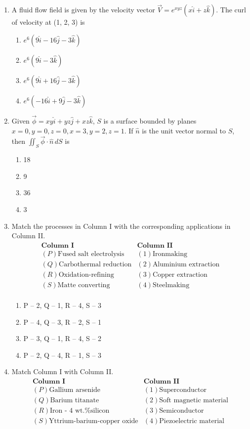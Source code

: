 \documentclass[12pt]{article}
\begin{document}
\begin{enumerate}
\item A fluid flow field is given by the velocity vector \(\vec{V} = e^{xyz}(x \hat{i} + z \hat{k})\). The curl of velocity at (1, 2, 3) is
\begin{enumerate}[label=(\alph*)]
\item \(e^{6}(9 \hat{i} - 16 \hat{j} - 3 \hat{k})\)
\item \(e^{6}(9 \hat{i} - 3 \hat{k})\)
\item \(e^{6}(9 \hat{i} + 16 \hat{j} - 3 \hat{k})\)
\item \(e^{6}(-16 \hat{i} + 9 \hat{j} - 3 \hat{k})\)
\end{enumerate}

\item Given \(\vec{\phi} = xy \hat{i} + yz \hat{j} + xz \hat{k}\), \(S\) is a surface bounded by planes \(x=0, y=0, z=0, x=3, y=2, z=1\). If \(\hat{n}\) is the unit vector normal to \(S\), then \(\iint_S \vec{\phi} \cdot \hat{n}\, dS\) is
\begin{enumerate}[label=(\alph*)]
\item 18
\item 9
\item 36
\item 3
\end{enumerate}

\item Match the processes in Column I with the corresponding applications in Column II.
\[
\begin{array}{ll}
\textbf{Column I} & \textbf{Column II} \\
(P) \text{Fused salt electrolysis} & (1) \text{Ironmaking} \\
(Q) \text{Carbothermal reduction} & (2) \text{Aluminium extraction} \\
(R) \text{Oxidation-refining} & (3) \text{Copper extraction} \\
(S) \text{Matte converting} & (4) \text{Steelmaking} \\
\end{array}
\]

\begin{enumerate}[label=(\alph*)]
\item P – 2, Q – 1, R – 4, S – 3
\item P – 4, Q – 3, R – 2, S – 1
\item P – 3, Q – 1, R – 4, S – 2
\item P – 2, Q – 4, R – 1, S – 3
\end{enumerate}

\item Match Column I with Column II.
\[
\begin{array}{ll}
\textbf{Column I} & \textbf{Column II} \\
(P) \text{Gallium arsenide} & (1) \text{Superconductor} \\
(Q) \text{Barium titanate} & (2) \text{Soft magnetic material} \\
(R) \text{Iron - 4 wt.\% silicon} & (3) \text{Semiconductor} \\
(S) \text{Yttrium-barium-copper oxide} & (4) \text{Piezoelectric material} \\
\end{array}
\]


\end{enumerate}
\end{document}
